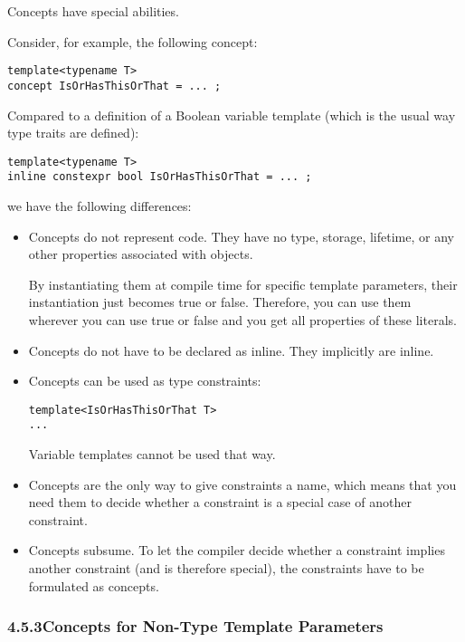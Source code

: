 Concepts have special abilities.

Consider, for example, the following concept:

\begin{lstlisting}[style=styleCXX]
template<typename T>
concept IsOrHasThisOrThat = ... ;
\end{lstlisting}

Compared to a definition of a Boolean variable template (which is the usual way type traits are defined):

\begin{lstlisting}[style=styleCXX]
template<typename T>
inline constexpr bool IsOrHasThisOrThat = ... ;
\end{lstlisting}

we have the following differences:

\begin{itemize}
\item
Concepts do not represent code. They have no type, storage, lifetime, or any other properties associated with objects.

By instantiating them at compile time for specific template parameters, their instantiation just becomes true or false. Therefore, you can use them wherever you can use true or false and you get all properties of these literals.

\item
Concepts do not have to be declared as inline. They implicitly are inline.

\item
Concepts can be used as type constraints:

\begin{lstlisting}[style=styleCXX]
template<IsOrHasThisOrThat T>
...
\end{lstlisting}

Variable templates cannot be used that way.

\item
Concepts are the only way to give constraints a name, which means that you need them to decide whether a constraint is a special case of another constraint.

\item
Concepts subsume. To let the compiler decide whether a constraint implies another constraint (and is therefore special), the constraints have to be formulated as concepts.
\end{itemize}

\subsubsection*{ 4.5.3\hspace{0.2cm}Concepts for Non-Type Template Parameters}

